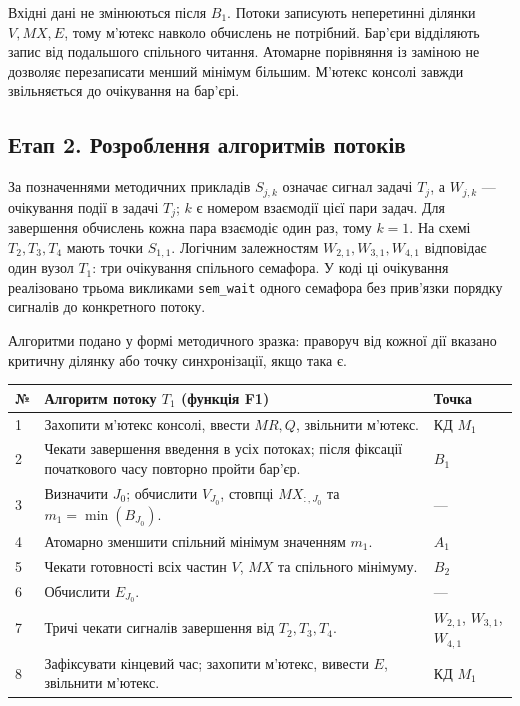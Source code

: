 \documentclass[12pt,a4paper]{article}
\begin{document}
Вхідні дані не змінюються після $B_1$. Потоки записують неперетинні
ділянки $V,MX,E$, тому м’ютекс навколо обчислень не потрібний.
Бар’єри відділяють запис від подальшого спільного читання.
Атомарне порівняння із заміною не дозволяє перезаписати менший мінімум
більшим. М’ютекс консолі завжди звільняється до очікування на бар’єрі.

\subsection{Етап 2. Розроблення алгоритмів потоків}

За позначеннями методичних прикладів $S_{j,k}$ означає сигнал задачі
$T_j$, а $W_{j,k}$ --- очікування події в задачі $T_j$; $k$ є номером
взаємодії цієї пари задач. Для завершення обчислень кожна пара
взаємодіє один раз, тому $k=1$. На схемі $T_2,T_3,T_4$ мають точки
$S_{1,1}$. Логічним залежностям $W_{2,1},W_{3,1},W_{4,1}$
відповідає один вузол $T_1$: три очікування спільного семафора.
У коді ці очікування реалізовано трьома викликами \texttt{sem\_wait}
одного семафора без прив’язки порядку сигналів до конкретного потоку.

Алгоритми подано у формі методичного зразка: праворуч від кожної дії
вказано критичну ділянку або точку синхронізації, якщо така є.

\begin{longtable}{|p{0.9cm}|p{11.2cm}|p{2.2cm}|}
\hline
\textbf{№} & \textbf{Алгоритм потоку $T_1$ (функція F1)} & \textbf{Точка}\\ \hline
1 & Захопити м’ютекс консолі, ввести $MR,Q$, звільнити м’ютекс. & КД $M_1$\\ \hline
2 & Чекати завершення введення в усіх потоках; після фіксації початкового часу повторно пройти бар’єр. & $B_1$\\ \hline
3 & Визначити $J_0$; обчислити $V_{J_0}$, стовпці $MX_{:,J_0}$ та $m_1=\min(B_{J_0})$. & ---\\ \hline
4 & Атомарно зменшити спільний мінімум значенням $m_1$. & $A_1$\\ \hline
5 & Чекати готовності всіх частин $V$, $MX$ та спільного мінімуму. & $B_2$\\ \hline
6 & Обчислити $E_{J_0}$. & ---\\ \hline
7 & Тричі чекати сигналів завершення від $T_2,T_3,T_4$. & $W_{2,1}$, $W_{3,1}$, $W_{4,1}$\\ \hline
8 & Зафіксувати кінцевий час; захопити м’ютекс, вивести $E$, звільнити м’ютекс. & КД $M_1$\\ \hline
\end{longtable}
\end{document}
